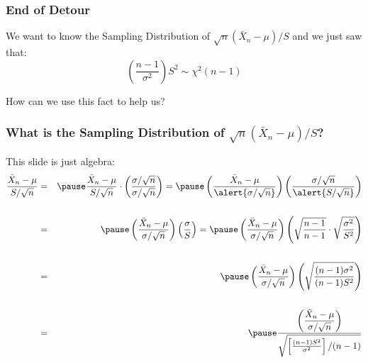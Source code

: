 \documentclass[handout]{beamer}
\begin{document}
\begin{frame}
\frametitle{End of Detour}
We want to know the Sampling Distribution of $\sqrt{n}(\bar{X}_n - \mu)/S$ and we just saw that:
$$\boxed{\left( \frac{n-1}{\sigma^2}\right)S^2\sim \chi^2(n-1)}$$
\begin{alertblock}{How can we use this fact to help us?}
\end{alertblock}
\end{frame}
\begin{frame}
\frametitle{What is the Sampling Distribution of $\sqrt{n}(\bar{X}_n-\mu)/S$?}
This slide is just algebra:
\begin{eqnarray*}
	\frac{\bar{X}_n - \mu}{S/\sqrt{n}} &=&\pause \frac{\bar{X}_n - \mu}{S/\sqrt{n}} \cdot \left(\frac{\sigma/\sqrt{n}}{\sigma/\sqrt{n}} \right) = \pause \left(\frac{\bar{X}_n - \mu}{\alert{\sigma/\sqrt{n}}} \right)\left(\frac{\sigma/\sqrt{n}}{\alert{S/\sqrt{n}}} \right)\\ \\
	&=& \pause\left(\frac{\bar{X}_n - \mu}{\sigma/\sqrt{n}} \right)\left(\frac{\sigma}{S} \right) = \pause  \left(\frac{\bar{X}_n - \mu}{\sigma/\sqrt{n}} \right)\left(\sqrt{\frac{n-1}{n-1}}\cdot\sqrt{\frac{\sigma^2}{S^2}} \right) \\ \\
	&=& \pause \left(\frac{\bar{X}_n - \mu}{\sigma/\sqrt{n}} \right)\left(\sqrt{\frac{(n-1)\sigma^2}{(n-1)S^2}} \right) \\ \\
	&=& \pause \frac{\displaystyle \left(\frac{\bar{X}_n - \mu}{\sigma/\sqrt{n}}\right)}{\sqrt{\left[\frac{(n-1)S^2}{\sigma^2}\right]/(n-1)}} 
\end{eqnarray*}
\end{frame}
\end{document}
